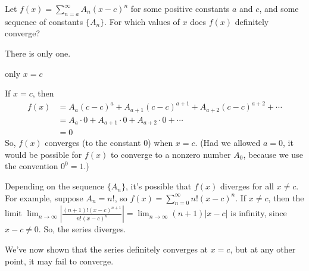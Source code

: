 \begin{question}
	Let $f(x)=\displaystyle \sum_{n=a}^\infty A_n(x-c)^n$ for some positive constants $a$ and $c$, and some sequence of constants $\{A_n\}$. For which values of $x$ does $f(x)$ definitely converge?
\end{question}
\begin{hint}
	There is only one.
\end{hint}
\begin{answer}
	only $x=c$
\end{answer}
\begin{solution}
	If $x=c$, then
	\begin{align*}
	f(x)&=A_a(c-c)^a+A_{a+1}(c-c)^{a+1}+A_{a+2}(c-c)^{a+2}+\cdots\\
	&=A_a \cdot 0+A_{a+1}\cdot 0+A_{a+2}\cdot 0+\cdots\\
	&=0
	\end{align*}
	 So, $f(x)$ converges (to the constant 0) when $x=c$. (Had we allowed $a=0$, it would be possible for $f(x)$ to converge to a nonzero number $A_0$, because we use the convention $0^0=1$.)

	 Depending on the sequence $\{A_n\}$,  it's possible that $f(x)$ diverges for all $x \neq c$. For example, suppose $A_n=n!$, so $f(x)=\displaystyle\sum_{n=0}^\infty n!(x-c)^n$. If $x \neq c$, then the limit $\displaystyle\lim_{n\to\infty}	 \left|\frac{(n+1)!(x-c)^{n+1}}{n!(x-c)^n}\right|=\lim_{n\to\infty}(n+1)|x-c|$  is infinity, since $x-c\neq 0$. So, the series diverges.

	 We've now shown that the series definitely converges at $x=c$, but at any other point, it may fail to converge.
\end{solution}



